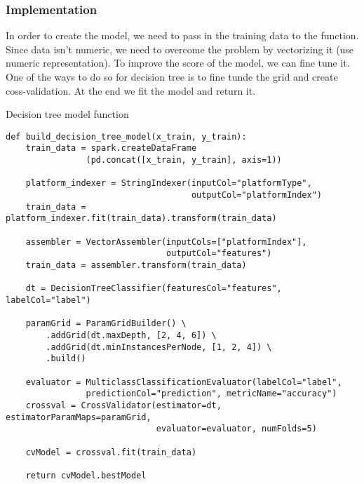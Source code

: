 \subsubsection{Implementation}

In order to create the model, we need to pass in the training data to the function. Since data isn't numeric, we need to overcome the problem by vectorizing it (use numeric representation). To improve the score of the model, we can fine tune it. One of the ways to do so for decision tree is to fine tunde the grid and create coss-validation. At the end we fit the model and return it.
\begin{listing}[H]
\caption{Decision tree model function}
\begin{verbatim}
def build_decision_tree_model(x_train, y_train):
    train_data = spark.createDataFrame
                (pd.concat([x_train, y_train], axis=1))

    platform_indexer = StringIndexer(inputCol="platformType", 
                                     outputCol="platformIndex")
    train_data = platform_indexer.fit(train_data).transform(train_data)

    assembler = VectorAssembler(inputCols=["platformIndex"], 
                                outputCol="features")
    train_data = assembler.transform(train_data)

    dt = DecisionTreeClassifier(featuresCol="features", labelCol="label")

    paramGrid = ParamGridBuilder() \
        .addGrid(dt.maxDepth, [2, 4, 6]) \
        .addGrid(dt.minInstancesPerNode, [1, 2, 4]) \
        .build()

    evaluator = MulticlassClassificationEvaluator(labelCol="label",
                predictionCol="prediction", metricName="accuracy")
    crossval = CrossValidator(estimator=dt, estimatorParamMaps=paramGrid, 
                              evaluator=evaluator, numFolds=5)

    cvModel = crossval.fit(train_data)

    return cvModel.bestModel
\end{verbatim}
\end{listing}





